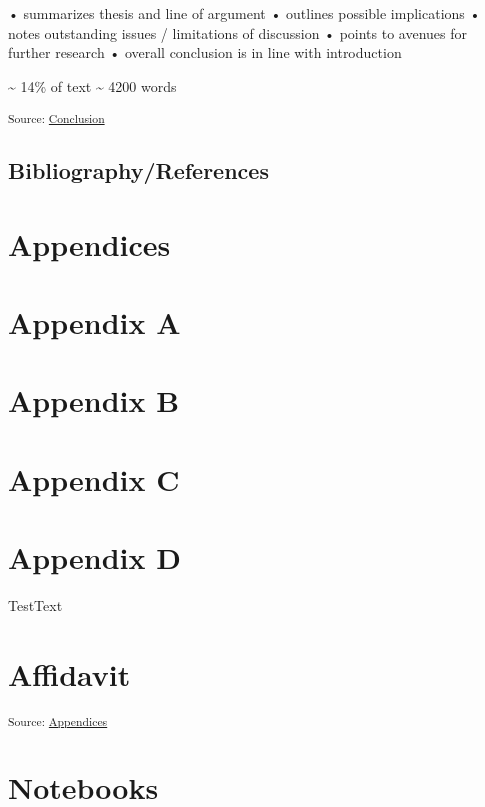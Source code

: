 \documentclass[12pt,a4paper]{book}      %
\begin{document}
• summarizes thesis and line of argument • outlines possible
implications • notes outstanding issues / limitations of discussion •
points to avenues for further research • overall conclusion is in line
with introduction

\textasciitilde{} 14\% of text \textasciitilde{} 4200 words

\textsubscript{Source:
\href{https://VJMeyer.github.io/submission/chapters/Conclusion.qmd.html\#c14cf960-be7f-4a4a-a8f5-39f3c1bea077}{Conclusion}}

\section*{Bibliography/References}\label{bibliographyreferences}

\label{refs}

\chapter{}\label{section-6}

\chapter{Appendices}\label{appendices}

\chapter{Appendix A}\label{appendix-a}

\chapter{Appendix B}\label{appendix-b}

\chapter{Appendix C}\label{appendix-c}

\chapter{Appendix D}\label{appendix-d}

TestText

\chapter{Affidavit}\label{affidavit}

\textsubscript{Source:
\href{https://VJMeyer.github.io/submission/chapters/Appendices.qmd.html\#7b34ca3e-6a0a-4856-b99b-06c7c16c11c8}{Appendices}}

\chapter{Notebooks}\label{notebooks}
\end{document}
